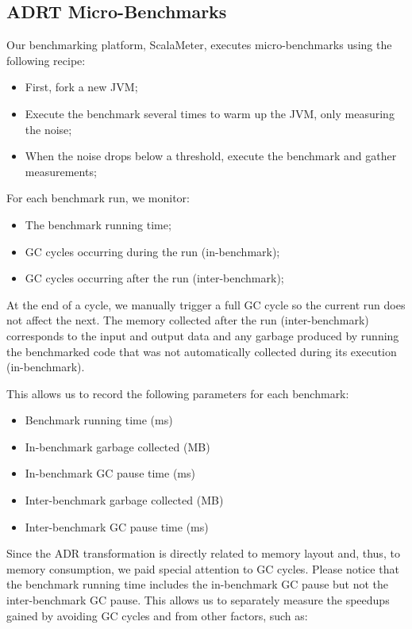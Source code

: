\subsection{ADRT Micro-Benchmarks}

Our benchmarking platform, ScalaMeter, executes micro-benchmarks using the following recipe:
\begin{itemize}
  \item First, fork a new JVM;
  \item Execute the benchmark several times to warm up the JVM, only measuring the noise;
  \item When the noise drops below a threshold, execute the benchmark and gather measurements;
\end{itemize}


\noindent
For each benchmark run, we monitor:
\begin{itemize}
  \item The benchmark running time;
  \item GC cycles occurring during the run (in-benchmark);
  \item GC cycles occurring after the run (inter-benchmark);
\end{itemize}


\noindent
At the end of a cycle, we manually trigger a full GC cycle so the current run does not affect the next. The memory collected after the run (inter-benchmark) corresponds to the input and output data and any garbage produced by running the benchmarked code that was not automatically collected during its execution (in-benchmark).

This allows us to record the following parameters for each benchmark:

\begin{itemize}
  \item Benchmark running time (ms)
  \item In-benchmark garbage collected (MB)
  \item In-benchmark GC pause time (ms)
  \item Inter-benchmark garbage collected (MB)
  \item Inter-benchmark GC pause time (ms)
\end{itemize}


\noindent
Since the ADR transformation is directly related to memory layout and, thus, to memory consumption, we paid special attention to GC cycles. Please notice that the benchmark running time includes the in-benchmark GC pause but not the inter-benchmark GC pause. This allows us to separately measure the speedups gained by avoiding GC cycles and from other factors, such as:

